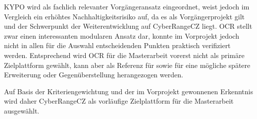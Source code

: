 KYPO wird als fachlich relevanter Vorgängeransatz eingeordnet, weist jedoch im Vergleich ein erhöhtes Nachhaltigkeitsrisiko auf, da es als Vorgängerprojekt gilt und der Schwerpunkt der Weiterentwicklung auf CyberRangeCZ liegt. OCR stellt zwar einen interessanten modularen Ansatz dar, konnte im Vorprojekt jedoch nicht in allen für die Auswahl entscheidenden Punkten praktisch verifiziert werden. Entsprechend wird OCR für die Masterarbeit vorerst nicht als primäre Zielplattform gewählt, kann aber als Referenz für sowie für eine mögliche spätere Erweiterung oder Gegenüberstellung herangezogen werden.

Auf Basis der Kriteriengewichtung und der im Vorprojekt gewonnenen Erkenntnis wird daher CyberRangeCZ als vorläufige Zielplattform für die Masterarbeit ausgewählt.
